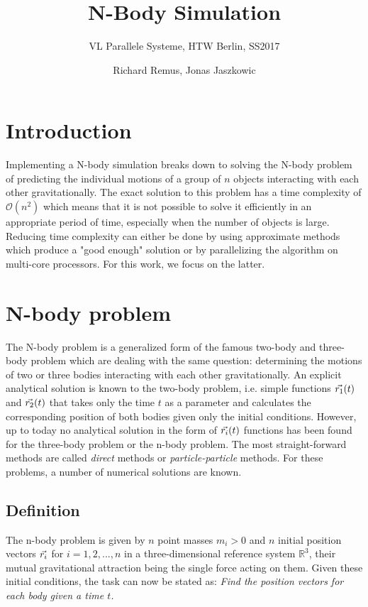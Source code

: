 \documentclass[a4paper,11pt]{scrartcl} %
\title{N-Body Simulation}
\subtitle{VL Parallele Systeme, HTW Berlin, SS2017}
\author{Richard Remus, Jonas Jaszkowic}
\date{}
\newcommand*{\vv}[1]{\vec{\mkern0mu#1}}
\begin{document}
\maketitle

\section{Introduction}
Implementing a N-body simulation breaks down to solving the N-body problem of predicting the individual motions of a group of $n$ objects interacting with each other gravitationally. The exact solution to this problem has a time complexity of $\mathcal{O}(n^2)$ which means that it is not possible to solve it efficiently in an appropriate period of time, especially when the number of objects is large. Reducing time complexity can either be done by using approximate methods which produce a "good enough" solution or by parallelizing the algorithm on multi-core processors. For this work, we focus on the latter.

\section{N-body problem}
The N-body problem is a generalized form of the famous two-body and three-body problem which are dealing with the same question: determining the motions of two or three bodies interacting with each other gravitationally. An explicit analytical solution is known to the two-body problem, i.e. simple functions $\vv{r_1}(t)$ and $\vv{r_2}(t)$ that takes only the time $t$ as a parameter and calculates the corresponding position of both bodies given only the initial conditions. However, up to today no analytical solution in the form of $\vv{r_i}(t)$ functions has been found for the three-body problem or the n-body problem. \cite{fridgeorders} The most straight-forward methods are called \textit{direct} methods or \textit{particle-particle} methods. For these problems, a number of numerical solutions are known.
\subsection{Definition}
The n-body problem is given by $n$ point masses $m_i > 0$ and $n$ initial position vectors $\vv{r_i}$ for $i=1,2,...,n$ in a three-dimensional reference system $\mathbb{R}^3$, their mutual gravitational attraction being the single force acting on them. \cite{meyer2008introduction}Given these initial conditions, the task can now be stated as: \textit{Find the position vectors for each body given a time $t$.}
\end{document}
